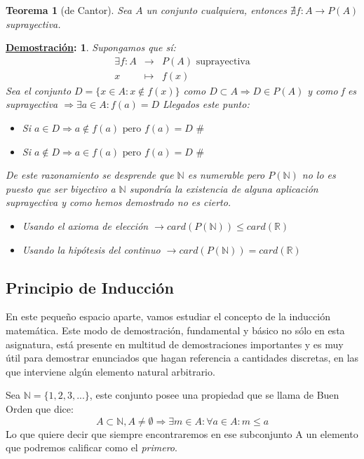 \documentclass[10pt,a4paper,openright]{book}
\theoremstyle{break}
\newtheorem*{theo}{Teorema}
\newtheorem*{demo}{\underline{Demostración}:}
\begin{document}
\begin{theo}[de Cantor]
Sea $A$ un conjunto cualquiera, entonces $\nexists f: A \rightarrow P(A)$  suprayectiva.
\end{theo}
\begin{demo}
Supongamos que sí:
\begin{eqnarray*}
\exists f: A &\rightarrow & P(A)\mbox{ suprayectiva} \\
x & \longmapsto & f(x)
\end{eqnarray*}
Sea el conjunto $D=\{ x\in A: x\notin f(x)\}$ como $D\subset A\Rightarrow D\in P(A)$ y como f es suprayectiva $\Rightarrow \exists a \in A : f(a)=D$
Llegados este punto:
\begin{itemize}
\item Si $a\in D\Rightarrow a\notin f(a)\mbox{ pero }f(a)=D \mbox{ \#}$
\item Si $a\notin D\Rightarrow a\in f(a)\mbox{ pero }f(a)=D \mbox{ \#}$
\end{itemize}

De este razonamiento se desprende que $\mathbb N$ es numerable pero $P(\mathbb N )$ no lo es puesto que ser biyectivo a $\mathbb N$ supondría la existencia de alguna aplicación suprayectiva y como hemos demostrado no es cierto.
\begin{itemize}
\item Usando el axioma de elección $\rightarrow card(P(\mathbb N))\leq card (\mathbb R)$
\item Usando la hipótesis del continuo $\rightarrow card(P(\mathbb N))= card (\mathbb R)$
\end{itemize}
\end{demo}

\subsection{Principio de Inducción}
En este pequeño espacio aparte, vamos estudiar el concepto de la inducción matemática. Este modo de demostración, fundamental y básico no sólo en esta asignatura, está presente en multitud de demostraciones importantes y es muy útil para demostrar enunciados que hagan referencia a cantidades discretas, en las que interviene algún elemento natural arbitrario.

Sea $\mathbb N=\{1, 2, 3,...\}$, este conjunto posee una propiedad que se llama de Buen Orden que dice:
$$A\subset \mathbb N, A\neq \emptyset \Rightarrow \exists m \in A : \forall a \in A : m\leq a$$
Lo que quiere decir que siempre encontraremos en ese subconjunto A un elemento que podremos calificar como el \textit{primero}.
\end{document}
